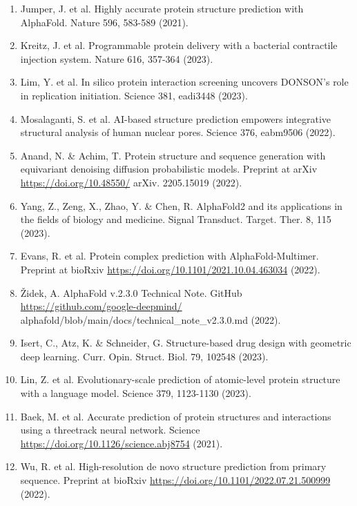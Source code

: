 \documentclass[10pt]{article}
\begin{document}
\begin{enumerate}
  \item Jumper, J. et al. Highly accurate protein structure prediction with AlphaFold. Nature 596, 583-589 (2021).
  \item Kreitz, J. et al. Programmable protein delivery with a bacterial contractile injection system. Nature 616, 357-364 (2023).
  \item Lim, Y. et al. In silico protein interaction screening uncovers DONSON's role in replication initiation. Science 381, eadi3448 (2023).
  \item Mosalaganti, S. et al. AI-based structure prediction empowers integrative structural analysis of human nuclear pores. Science 376, eabm9506 (2022).
  \item Anand, N. \& Achim, T. Protein structure and sequence generation with equivariant denoising diffusion probabilistic models. Preprint at arXiv \href{https://doi.org/10.48550/}{https://doi.org/10.48550/} arXiv. 2205.15019 (2022).
  \item Yang, Z., Zeng, X., Zhao, Y. \& Chen, R. AlphaFold2 and its applications in the fields of biology and medicine. Signal Transduct. Target. Ther. 8, 115 (2023).
  \item Evans, R. et al. Protein complex prediction with AlphaFold-Multimer. Preprint at bioRxiv \href{https://doi.org/10.1101/2021.10.04.463034}{https://doi.org/10.1101/2021.10.04.463034} (2022).
  \item Židek, A. AlphaFold v.2.3.0 Technical Note. GitHub \href{https://github.com/google-deepmind/}{https://github.com/google-deepmind/} alphafold/blob/main/docs/technical\_note\_v2.3.0.md (2022).
  \item Isert, C., Atz, K. \& Schneider, G. Structure-based drug design with geometric deep learning. Curr. Opin. Struct. Biol. 79, 102548 (2023).
  \item Lin, Z. et al. Evolutionary-scale prediction of atomic-level protein structure with a language model. Science 379, 1123-1130 (2023).
  \item Baek, M. et al. Accurate prediction of protein structures and interactions using a threetrack neural network. Science \href{https://doi.org/10.1126/science.abj8754}{https://doi.org/10.1126/science.abj8754} (2021).
  \item Wu, R. et al. High-resolution de novo structure prediction from primary sequence. Preprint at bioRxiv \href{https://doi.org/10.1101/2022.07.21.500999}{https://doi.org/10.1101/2022.07.21.500999} (2022).

\end{enumerate}
\end{document}
